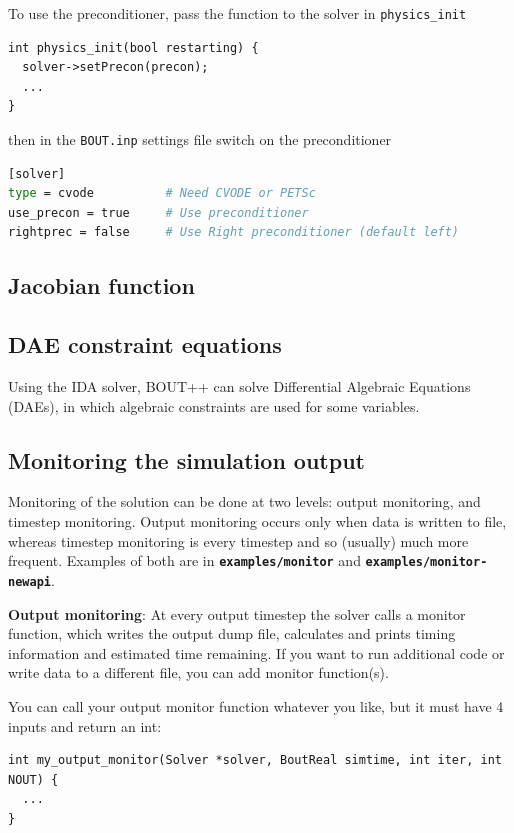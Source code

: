 \documentclass[12pt]{article}
\newcommand{\file}[1]{\texttt{\bf #1}}
\begin{document}
To use the preconditioner, pass the function to the solver in \lstinline!physics_init!
\begin{lstlisting}
int physics_init(bool restarting) {
  solver->setPrecon(precon);
  ...
}
\end{lstlisting}
then in the \texttt{BOUT.inp} settings file switch on the preconditioner
\begin{lstlisting}[language=bash,numbers=none]
[solver]
type = cvode          # Need CVODE or PETSc
use_precon = true     # Use preconditioner
rightprec = false     # Use Right preconditioner (default left)
\end{lstlisting}

\subsection{Jacobian function}



\subsection{DAE constraint equations}

Using the IDA solver, BOUT++ can solve Differential Algebraic Equations (DAEs), in which
algebraic constraints are used for some variables.


\subsection{Monitoring the simulation output}

Monitoring of the solution can be done at two levels: output monitoring, and timestep monitoring. Output monitoring
occurs only when data is written to file, whereas timestep monitoring is every timestep and so (usually) much more
frequent. Examples of both are in \file{examples/monitor} and \file{examples/monitor-newapi}.

{\bf Output monitoring}: At every output timestep the solver calls a monitor function, which writes the output dump file,
calculates and prints timing information and estimated time remaining. If you want to run additional code or write data to a different file, you can add monitor function(s).

You can call your output monitor function whatever you like, but it must have 4 inputs and return an int:
\begin{lstlisting}
int my_output_monitor(Solver *solver, BoutReal simtime, int iter, int NOUT) {
  ...
}
\end{lstlisting}
\end{document}
